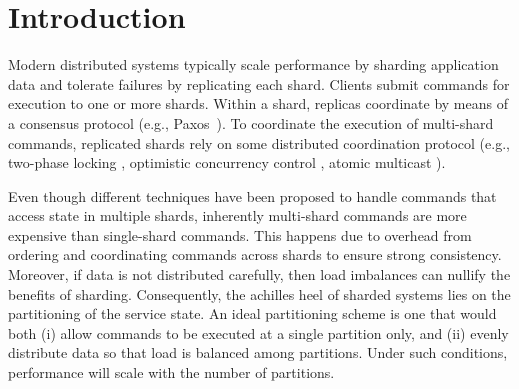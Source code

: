\section{Introduction}

Modern distributed systems typically scale performance by sharding application data and tolerate failures by replicating each shard. 
Clients submit commands for execution to one or more shards.
Within a shard, replicas coordinate by means of a consensus protocol (e.g., Paxos~\cite{Lam98}).
To coordinate the execution of multi-shard commands, replicated shards rely on some distributed coordination protocol (e.g., two-phase locking \cite{corbett2013spanner}, optimistic concurrency control \cite{Chang:2008}, atomic multicast \cite{bezerra2014ssmr}).

Even though different techniques have been proposed to handle commands that access state in multiple shards, inherently multi-shard commands are more expensive than single-shard commands.
This happens due to overhead from ordering and coordinating commands across shards to ensure strong consistency.
Moreover, if data is not distributed carefully, then load imbalances can nullify the benefits of sharding. 
Consequently, the achilles heel of sharded systems lies on the partitioning of the service state.
An ideal partitioning scheme is one that would both (i) allow commands to be executed at a single partition only, and (ii) evenly distribute data so that load is balanced among partitions.
Under such conditions, performance will scale with the number of partitions.



